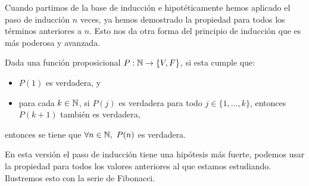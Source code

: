 Cuando partimos de la base de inducción e hipotéticamente hemos aplicado el paso de inducción $n$ veces, ya hemos demostrado la propiedad para todos los términos anteriores a $n$.
Esto nos da otra forma del principio de inducción que es más poderosa y avanzada.

\medskip

\begin{pp}[{\bf fuerte}]
Dada una función proposicional $P:\mathbb{N}\rightarrow \{V,F\}$, si esta cumple que:
\begin{itemize}
\item $P(1)$ es verdadera, y
\item para cada $k\in\mathbb{N}$, si $P(j)$ es verdadera para todo $j\in\{1,\dots,k\}$, entonces $P(k+1)$ también es verdadera,
\end{itemize}
entonces se tiene que $\forall n\in\N,\ P(n)$ es verdadera.
\end{pp}

En esta versión el paso de inducción tiene una hipótesis más fuerte, podemos usar la propiedad para todos los valores anteriores al que estamos estudiando. 
Ilustremos esto con la serie de Fibonacci.

